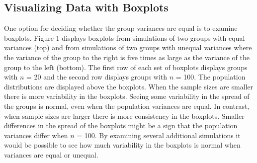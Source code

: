 \documentclass[man,a4paper,noextraspace,apacite]{apa6}
\begin{document}
\subsection{Visualizing Data with Boxplots} 
    One option for deciding whether the group variances are equal is to examine boxplots. Figure 1 displays boxplots from simulations of two groups with equal variances (top) and from simulations of two groups with unequal variances where the variance of the group to the right is five times as large as the variance of the group to the left (bottom). The first row of each set of boxplots displays groups with $n$ = 20 and the second row displays groups with $n$ = 100. The population distributions are displayed above the boxplots. When the sample sizes are smaller there is more variability in the boxplots. Seeing some variability in the spread of the groups is normal, even when the population variances are equal. In contrast, when sample sizes are larger there is more consistency in the boxplots. Smaller differences in the spread of the boxplots might be a sign that the population variances differ when $n$ = 100. By examining several additional simulations it would be possible to see how much variability in the boxplots is normal when variances are equal or unequal.
   
\end{document}
